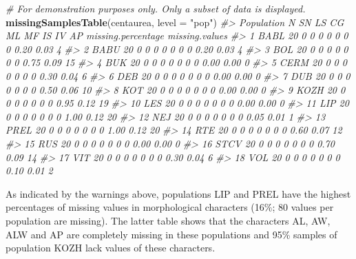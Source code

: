 \documentclass[
]{article}
\newenvironment{Shaded}{\begin{snugshade}}{\end{snugshade}}
\newcommand{\CommentTok}[1]{\textcolor[rgb]{0.56,0.35,0.01}{\textit{#1}}}
\newcommand{\DataTypeTok}[1]{\textcolor[rgb]{0.13,0.29,0.53}{#1}}
\newcommand{\KeywordTok}[1]{\textcolor[rgb]{0.13,0.29,0.53}{\textbf{#1}}}
\newcommand{\NormalTok}[1]{#1}
\newcommand{\StringTok}[1]{\textcolor[rgb]{0.31,0.60,0.02}{#1}}
\begin{document}
\begin{Shaded}
\begin{Highlighting}[]
\CommentTok{# For demonstration purposes only. Only a subset of data is displayed.}
\KeywordTok{missingSamplesTable}\NormalTok{(centaurea, }\DataTypeTok{level =} \StringTok{"pop"}\NormalTok{)}
\CommentTok{#>    Population  N SN LS CG ML MF IS IV   AP missing.percentage missing.values}
\CommentTok{#> 1        BABL 20  0  0  0  0  0  0  0 0.20               0.03              4}
\CommentTok{#> 2        BABU 20  0  0  0  0  0  0  0 0.20               0.03              4}
\CommentTok{#> 3         BOL 20  0  0  0  0  0  0  0 0.75               0.09             15}
\CommentTok{#> 4         BUK 20  0  0  0  0  0  0  0 0.00               0.00              0}
\CommentTok{#> 5        CERM 20  0  0  0  0  0  0  0 0.30               0.04              6}
\CommentTok{#> 6         DEB 20  0  0  0  0  0  0  0 0.00               0.00              0}
\CommentTok{#> 7         DUB 20  0  0  0  0  0  0  0 0.50               0.06             10}
\CommentTok{#> 8         KOT 20  0  0  0  0  0  0  0 0.00               0.00              0}
\CommentTok{#> 9        KOZH 20  0  0  0  0  0  0  0 0.95               0.12             19}
\CommentTok{#> 10        LES 20  0  0  0  0  0  0  0 0.00               0.00              0}
\CommentTok{#> 11        LIP 20  0  0  0  0  0  0  0 1.00               0.12             20}
\CommentTok{#> 12        NEJ 20  0  0  0  0  0  0  0 0.05               0.01              1}
\CommentTok{#> 13       PREL 20  0  0  0  0  0  0  0 1.00               0.12             20}
\CommentTok{#> 14        RTE 20  0  0  0  0  0  0  0 0.60               0.07             12}
\CommentTok{#> 15        RUS 20  0  0  0  0  0  0  0 0.00               0.00              0}
\CommentTok{#> 16       STCV 20  0  0  0  0  0  0  0 0.70               0.09             14}
\CommentTok{#> 17        VIT 20  0  0  0  0  0  0  0 0.30               0.04              6}
\CommentTok{#> 18        VOL 20  0  0  0  0  0  0  0 0.10               0.01              2}
\end{Highlighting}
\end{Shaded}

As indicated by the warnings above, populations LIP and PREL have the
highest percentages of missing values in morphological characters (16\%;
80 values per population are missing). The latter table shows that the
characters AL, AW, ALW and AP are completely missing in these
populations and 95\% samples of population KOZH lack values of these
characters.
\end{document}

